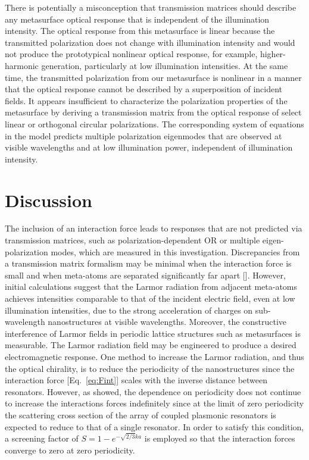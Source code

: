 There is potentially a misconception that transmission matrices should describe any metasurface optical response that is independent of the illumination intensity. The optical response from this metasurface is linear because the transmitted polarization does not change with illumination intensity and would not produce the prototypical nonlinear optical response, for example, higher-harmonic generation, particularly at low illumination intensities. At the same time, the transmitted polarization from our metasurface is nonlinear in a manner that the optical response cannot be described by a superposition of incident fields. It appears insufficient to characterize the polarization properties of the metasurface by deriving a transmission matrix from the optical response of select linear or orthogonal circular polarizations. The corresponding system of equations in the model predicts multiple polarization eigenmodes that are observed at visible wavelengths and at low illumination power, independent of illumination intensity.

\section{Discussion}

The inclusion of an interaction force leads to responses that are not predicted via transmission matrices, such as polarization-dependent OR or multiple eigen-polarization modes, which are measured in this investigation. Discrepancies from a transmission matrix formalism may be minimal when the interaction force is small and when meta-atoms are separated significantly far apart [\cite{Haus}]. However, initial calculations suggest that the Larmor radiation from adjacent meta-atoms achieves intensities comparable to that of the incident electric field, even at low illumination intensities, due to the strong acceleration of charges on sub-wavelength nanostructures at visible wavelengths. Moreover, the constructive interference of Larmor fields in periodic lattice structures such as metasurfaces is measurable. The Larmor radiation field may be engineered to produce a desired electromagnetic response.
One method to increase the Larmor radiation, and thus the optical chirality, is to reduce the periodicity of the nanostructures since the interaction force [Eq.~\ref{eq:Fint}] scales with the inverse distance between resonators. However, as \cite{Lee16} showed, the dependence on periodicity does not continue to increase the interactions forces indefinitely since at the limit of zero periodicity the scattering cross section of the array of coupled plasmonic resonators is expected to reduce to that of a single resonator. In order to satisfy this condition, a screening factor of $ S=1-e^{-\sqrt{2/3}ka}$ is employed so that the interaction forces converge to zero at zero periodicity.  

